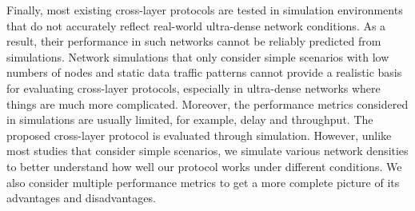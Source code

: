 \documentclass[a4paper,fleqn]{cas-dc}
\numberwithin{equation}{section}
\begin{document}
Finally, most existing cross-layer protocols are tested in simulation environments that do not accurately reflect real-world ultra-dense network conditions. As a result, their performance in such networks cannot be reliably predicted from simulations. Network simulations that only consider simple scenarios with low numbers of nodes and static data traffic patterns cannot provide a realistic basis for evaluating cross-layer protocols, especially in ultra-dense networks where things are much more complicated. Moreover, the performance metrics considered in simulations are usually limited, for example, delay and throughput. The proposed cross-layer protocol is evaluated through simulation. However, unlike most studies that consider simple scenarios, we simulate various network densities to better understand how well our protocol works under different conditions. We also consider multiple performance metrics to get a more complete picture of its advantages and disadvantages.
\end{document}
